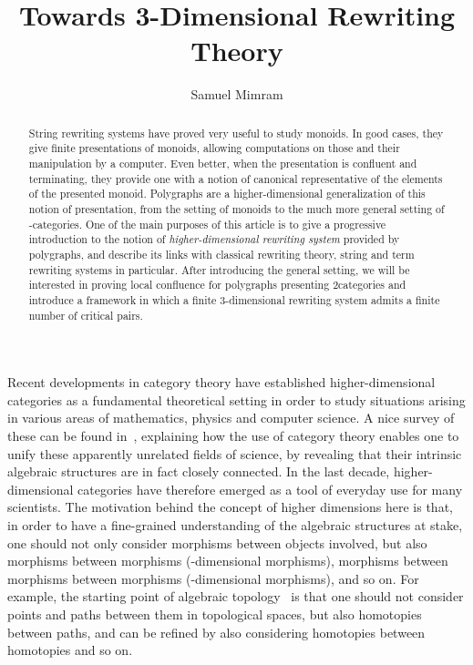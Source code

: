 \documentclass{LMCS}
\title[Towards 3-Dimensional Rewriting Theory]
      {Towards 3-Dimensional Rewriting Theory}
\author[S.~Mimram]{Samuel Mimram}
\begin{document}
\begin{abstract}
  String rewriting systems have proved very useful to study monoids. In good
  cases, they give finite presentations of monoids, allowing computations on
  those and their manipulation by a computer. Even better, when the presentation
  is confluent and terminating, they provide one with a notion of canonical
  representative of the elements of the presented monoid. Polygraphs are a
  higher-dimensional generalization of this notion of presentation, from the
  setting of monoids to the much more general setting of -categories. One of
  the main purposes of this article is to give a progressive introduction to the
  notion of \emph{higher-dimensional rewriting system} provided by polygraphs,
  and describe its links with classical rewriting theory, string and term
  rewriting systems in particular. After introducing the general setting, we
  will be interested in proving local confluence for polygraphs presenting
  2\nbd{}categories and introduce a framework in which a finite 3-dimensional
  rewriting system admits a finite number of critical pairs.
\end{abstract}

\maketitle

Recent developments in category theory have established higher-dimensional
categories as a fundamental theoretical setting in order to study situations
arising in various areas of mathematics, physics and computer science. A nice
survey of these can be found in~\cite{baez:rosetta-stone}, explaining how the
use of category theory enables one to unify these apparently unrelated fields of
science, by revealing that their intrinsic algebraic structures are in fact
closely connected. In the last decade, higher-dimensional categories have
therefore emerged as a tool of everyday use for many scientists. The motivation
behind the concept of higher dimensions here is that, in order to have a
fine-grained understanding of the algebraic structures at stake, one should not
only consider morphisms between objects involved, but also morphisms between
morphisms (-dimensional morphisms), morphisms between morphisms between
morphisms (-dimensional morphisms), and so on. For example, the starting
point of algebraic topology~\cite{hatcher:algebraic-topology} is that one should
not consider points and paths between them in topological spaces, but also
homotopies between paths, and can be refined by also considering homotopies
between homotopies and so on.
\end{document}
